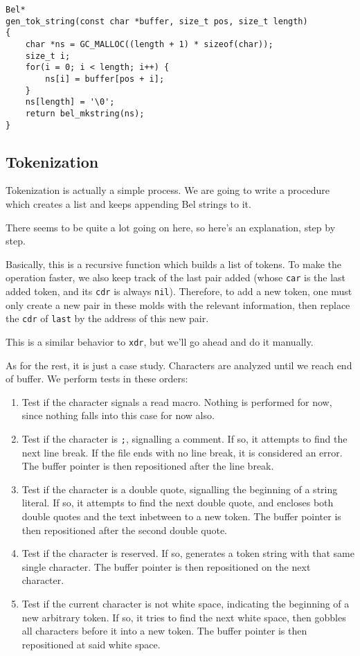 \documentclass[openright,a4paper,twoside,12pt]{memoir}
\begin{document}
\begin{verbatim}
Bel*
gen_tok_string(const char *buffer, size_t pos, size_t length)
{
    char *ns = GC_MALLOC((length + 1) * sizeof(char));
    size_t i;
    for(i = 0; i < length; i++) {
        ns[i] = buffer[pos + i];
    }
    ns[length] = '\0';
    return bel_mkstring(ns);
}
\end{verbatim}

\subsection{Tokenization}
\label{sec:org33c898a}

Tokenization is  actually a simple  process. We  are going to  write a
procedure which creates a list and keeps appending Bel strings to it.

There seems to be quite a lot going on here, so here's an explanation,
step by step.

Basically,  this  is a  recursive  function  which  builds a  list  of
tokens. To make  the operation faster, we also keep  track of the last
pair added (whose \texttt{car}  is the last added token, and  its \texttt{cdr} is always
\texttt{nil}). Therefore, to add  a new token, one must only  create a new pair
in these molds with the relevant  information, then replace the \texttt{cdr} of
\texttt{last} by the  address of this new  pair.

This  is a  similar behavior  to \texttt{xdr},  but we'll  go ahead  and do  it
manually.

As for  the rest,  it is  just a case  study. Characters  are analyzed
until we reach end of buffer. We perform tests in these orders:

\begin{enumerate}
\item Test  if the character signals  a read macro. Nothing  is performed
for now, since nothing falls into this case for now also.
\item Test if  the  character is  \texttt{;},  signalling a  comment.  If so,  it
attempts to find the next line break. If the file ends with no line
break,  it is  considered  an  error. The  buffer  pointer is  then
repositioned after the line break.
\item Test if  the character is a double quote,  signalling the beginning
of a  string literal. If  so, it attempts  to find the  next double
quote, and encloses both double quotes  and the text inbetween to a
new token. The buffer pointer is then repositioned after the second
double quote.
\item Test if the character is  reserved. If so, generates a token string
with  that  same  single  character. The  buffer  pointer  is  then
repositioned on the next character.
\item Test  if the current character  is not white space,  indicating the
beginning of  a new arbitrary  token. If so,  it tries to  find the
next white space, then gobbles all  characters before it into a new
token.  The  buffer pointer  is  then  repositioned at  said  white
space.
\end{enumerate}
\end{document}
